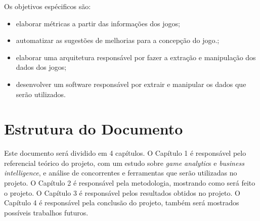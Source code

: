 	Os objetivos espécificos são:
	\begin{itemize}
		\item elaborar métricas a partir das informações dos jogos;
		\item automatizar as sugestões de melhorias para a concepção do jogo.;
		\item elaborar uma arquitetura responsável por fazer a extração e manipulação dos dados dos jogos;
		\item desenvolver um software responsável por extrair e manipular os dados que serão utilizados.
	\end{itemize}
\section*{Estrutura do Documento}
Este documento será dividido em 4 capítulos. O Capítulo 1 é responsável pelo referencial teórico do projeto, com um estudo sobre \textit{game analytic}s e \textit{business intelligence}, e análise de concorrentes e ferramentas que serão utilizadas no projeto. O Capítulo 2 é responsável pela metodologia, mostrando como será feito o projeto. O Capítulo 3 é responsável pelos resultados obtidos no projeto. O Capítulo 4 é responsável pela conclusão do projeto, também será mostrados possíveis trabalhos futuros.